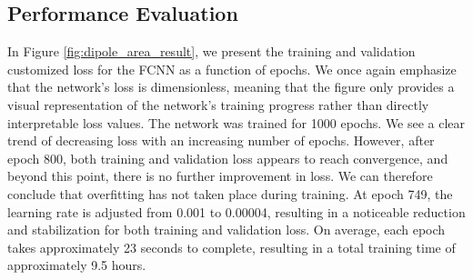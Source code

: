 \documentclass[a4paper, UKenglish, 11pt]{uiomaster}
\begin{document}



\subsection{Performance Evaluation}

In Figure \ref{fig:dipole_area_result}, we present the training and validation customized loss for the FCNN as a function of epochs. We once again emphasize that the network's loss is dimensionless, meaning that the figure only provides a visual representation of the network's training progress rather than directly interpretable loss values. The network was trained for 1000 epochs. We see a clear trend of decreasing loss with an increasing number of epochs. However, after epoch 800, both training and validation loss appears to reach convergence, and beyond this point, there is no further improvement in loss. We can therefore conclude that overfitting has not taken place during training. At epoch 749, the learning rate is adjusted from 0.001 to 0.00004, resulting in a noticeable reduction and stabilization for both training and validation loss. On average, each epoch takes approximately 23 seconds to complete, resulting in a total training time of approximately 9.5 hours.
\end{document}
